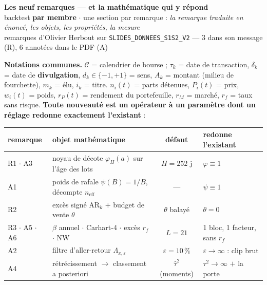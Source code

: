 \documentclass[11pt,a4paper]{article}
\begin{document}
\begin{center}
{\LARGE\bfseries Les neuf remarques --- et la mathématique qui y répond}\\[1mm]
{\normalsize backtest \textbf{par membre} $\cdot$ une section par remarque : \emph{la remarque traduite en énoncé, les objets, les propriétés, la mesure}}\\[0.5mm]
{\small\color{grisf} remarques d'Olivier Herbout sur \texttt{SLIDES\_DONNEES\_S1S2\_V2} --- 3 dans son message (R), 6 annotées dans le PDF (A)}
\end{center}

\vspace{0.5mm}
\begin{mdframed}[linecolor=grisf, backgroundcolor=grisf!6, linewidth=0.8pt, roundcorner=4pt]
\textbf{Notations communes.} $\mathcal{C}$ = calendrier de bourse ; $\tau_k$ = date de transaction, $\delta_k$ = date de
\textbf{divulgation}, $d_k \in \{-1,+1\}$ = sens, $A_k$ = montant (milieu de fourchette), $m_k$ = élu, $i_k$ = titre.
$n_i(t)$ = parts détenues, $P_i(t)$ = prix, $w_i(t)$ = poids, $r_P(t)$ = rendement du portefeuille,
$r_M$ = marché, $r_f$ = taux sans risque.
\textbf{Toute nouveauté est un opérateur à un paramètre dont un réglage redonne exactement l'existant} :

\vspace{1.5mm}
\begin{center}\footnotesize
\begin{tabular}{@{}l l c l@{}}
\toprule
\textbf{remarque} & \textbf{objet mathématique} & \textbf{défaut} & \textbf{redonne l'existant} \\
\midrule
R1 $\cdot$ A3 & noyau de décote $\varphi_H(a)$ sur l'âge des lots & $H = 252$ j & $\varphi \equiv 1$ \\
A1 & poids de rafale $\psi(B) = 1/B$, décompte $n_{\text{eff}}$ & --- & $\psi \equiv 1$ \\
R2 & excès signé $\mathrm{AR}_k$ $+$ budget de vente $\theta$ & $\theta$ balayé & $\theta = 0$ \\
R3 $\cdot$ A5 $\cdot$ A6 & $\beta$ annuel $\cdot$ Carhart-4 $\cdot$ excès $r_f$ $\cdot$ NW & $L = 21$ & 1 bloc, 1 facteur, sans $r_f$ \\
A2 & filtre d'aller-retour $\Lambda_{x,\varepsilon}$ & $\varepsilon = 10\,\%$ & $\varepsilon \to \infty$ : clip brut \\
A4 & rétrécissement $\to$ classement a posteriori & $\hat\tau^2$ (moments) & $\tau^2 \to \infty$ $+$ la porte \\
\bottomrule
\end{tabular}
\end{center}
\end{mdframed}
\end{document}
